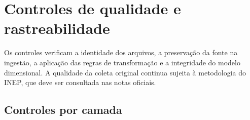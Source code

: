 \chapter{Controles de qualidade e rastreabilidade}
\label{ap:qualidade}
\setlength{\tabcolsep}{2pt}
\setlength{\emergencystretch}{3em}

Os controles verificam a identidade dos arquivos, a preservação da fonte na ingestão, a aplicação das regras de transformação e a integridade do modelo dimensional. A qualidade da coleta original continua sujeita à metodologia do INEP, que deve ser consultada nas notas oficiais.

\section{Controles por camada}

